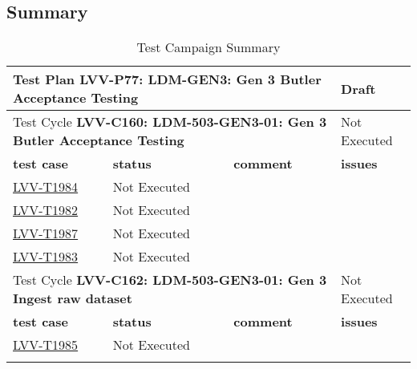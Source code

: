 \documentclass[DM,lsstdraft,STR,toc]{lsstdoc}
\begin{document}
\subsection{Summary}
\label{sect:summarytable}

\begin{longtable}{p{2cm}p{2.5cm}p{9cm}p{2.5cm}}
\toprule
\multicolumn{3}{p{13.5cm}}{ Test Plan {\bf LVV-P77: LDM-GEN3: Gen 3 Butler Acceptance Testing }} & Draft \\\hline

  \multicolumn{3}{p{13.5cm}}{ Test Cycle {\bf LVV-C160: LDM-503-GEN3-01: Gen 3 Butler Acceptance Testing }} & Not Executed \\\hline

  {\bf \footnotesize test case} & {\bf \footnotesize status} & {\bf \footnotesize comment} & {\bf \footnotesize issues} \\\toprule

\href{https://jira.lsstcorp.org/secure/Tests.jspa#/testCase/LVV-T1984}{LVV-T1984}
    & Not Executed &
    \begin{minipage}[]{9cm}
    \smallskip
    
    \medskip
    \end{minipage}
    &
    \\\hline
\href{https://jira.lsstcorp.org/secure/Tests.jspa#/testCase/LVV-T1982}{LVV-T1982}
    & Not Executed &
    \begin{minipage}[]{9cm}
    \smallskip
    
    \medskip
    \end{minipage}
    &
    \\\hline
\href{https://jira.lsstcorp.org/secure/Tests.jspa#/testCase/LVV-T1987}{LVV-T1987}
    & Not Executed &
    \begin{minipage}[]{9cm}
    \smallskip
    
    \medskip
    \end{minipage}
    &
    \\\hline
\href{https://jira.lsstcorp.org/secure/Tests.jspa#/testCase/LVV-T1983}{LVV-T1983}
    & Not Executed &
    \begin{minipage}[]{9cm}
    \smallskip
    
    \medskip
    \end{minipage}
    &
    \\\hline

  \multicolumn{3}{p{13.5cm}}{ Test Cycle {\bf LVV-C162: LDM-503-GEN3-01: Gen 3 Ingest raw dataset }} & Not Executed \\\hline

  {\bf \footnotesize test case} & {\bf \footnotesize status} & {\bf \footnotesize comment} & {\bf \footnotesize issues} \\\toprule

\href{https://jira.lsstcorp.org/secure/Tests.jspa#/testCase/LVV-T1985}{LVV-T1985}
    & Not Executed &
    \begin{minipage}[]{9cm}
    \smallskip
    
    \medskip
    \end{minipage}
    &
    \\\hline
\caption{Test Campaign Summary}
\label{table:summary}
\end{longtable}
\end{document}
